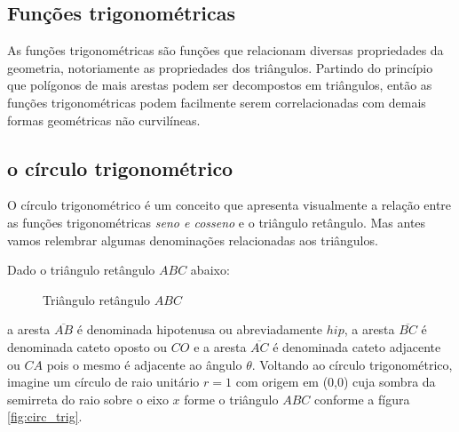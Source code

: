 \begin{multicols*}{2}

    \section{Funções trigonométricas}
    As funções trigonométricas são funções que relacionam diversas propriedades
    da geometria, notoriamente as propriedades dos triângulos. Partindo do
    princípio que polígonos de mais arestas podem ser decompostos em triângulos,
    então as funções trigonométricas podem facilmente serem correlacionadas com
    demais formas geométricas não curvilíneas.

    \subsection{o círculo trigonométrico}
    O círculo trigonométrico é um conceito que apresenta visualmente a relação
    entre as funções trigonométricas \textit{seno e cosseno} e o triângulo retângulo.
    Mas antes vamos relembrar algumas denominações relacionadas aos triângulos.

    Dado o triângulo retângulo $ABC$ abaixo:
    \begin{figure}[H]
        \centering
        \caption{Triângulo retângulo $ABC$}
        \label{fig:tri_abc}
    \end{figure}
    \noindent a aresta $\overline{AB}$ é denominada hipotenusa ou abreviadamente $hip$,
    a aresta $\overline{BC}$ é denominada cateto oposto ou $CO$ e a aresta
    $\overline{AC}$ é denominada cateto adjacente ou $CA$ pois o mesmo é
    adjacente ao ângulo $\theta$. Voltando ao círculo trigonométrico, imagine
    um círculo de raio unitário $r=1$ com origem em (0,0) cuja sombra da semirreta do raio sobre o eixo
    $x$ forme o triângulo $ABC$ conforme a fígura \ref{fig:circ_trig}.


\end{multicols*}
